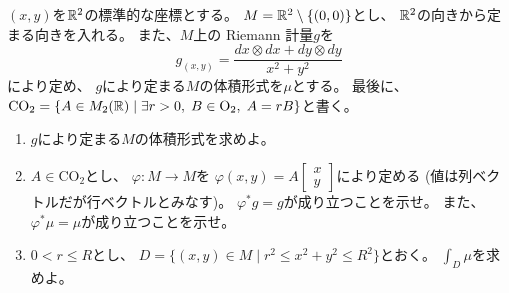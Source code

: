 \documentclass[report, notitlepage]{jlreq}
\begin{document}
\begin{problem}[問2]
    $(x, y)$を$\mathbb{R}^2$の標準的な座標とする。
    $M = \mathbb{R}^2 \setminus \{ (0, 0) \}$とし、
    $\mathbb{R}^2$の向きから定まる向きを入れる。
    また、$M$上の Riemann 計量$g$を
    \begin{equation}
        g_{(x, y)} = \frac{dx \otimes dx + dy \otimes dy}{x^2 + y^2}
    \end{equation}
    により定め、
    $g$により定まる$M$の体積形式を$\mu$とする。
    最後に、
    $\mathrm{CO}_2 = \{
        A \in M_2(\mathbb{R})
        \mid
        \exists r > 0, \; B \in \mathrm{O}_2, \; A = rB
    \}$と書く。
    \begin{enumerate}
        \item $g$により定まる$M$の体積形式を求めよ。
        \item $A \in \mathrm{CO}_2$とし、
            $\varphi \colon M \to M$を
            $\varphi(x, y) = A \begin{bmatrix}
                x \\
                y
            \end{bmatrix}$により定める (値は列ベクトルだが行ベクトルとみなす)。
            $\varphi^* g = g$が成り立つことを示せ。
            また、$\varphi^* \mu = \mu$が成り立つことを示せ。
        \item $0 < r \le R$とし、
            $D = \{ (x, y) \in M \mid r^2 \le x^2 + y^2 \le R^2 \}$とおく。
            $\int_D \mu$を求めよ。
    \end{enumerate}
\end{problem}
\end{document}
